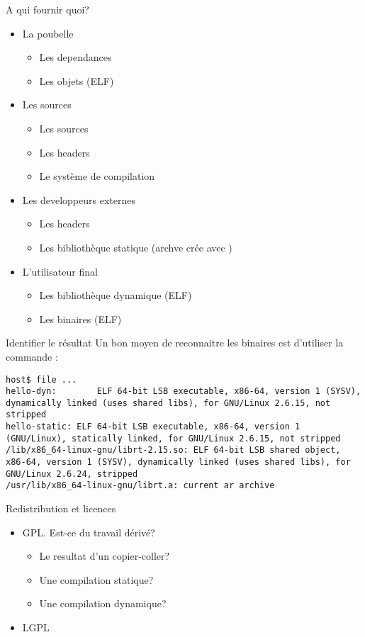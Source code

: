 \begin{frame}[fragile=singleslide]{A qui fournir quoi?}
  \begin{itemize}
  \item La poubelle
    \begin{itemize}
    \item Les dependances
    \item Les objets (ELF)
    \end{itemize}
  \item Les sources
    \begin{itemize}
    \item Les sources
    \item Les headers
    \item Le système de compilation
    \end{itemize}
  \item Les developpeurs externes
    \begin{itemize}
    \item Les headers
    \item Les bibliothèque statique (archve crée avec )
    \end{itemize}
  \item L'utilisateur final
    \begin{itemize}
    \item Les bibliothèque dynamique (ELF)
    \item Les binaires (ELF)
    \end{itemize}
  \end{itemize}
\end{frame}

\begin{frame}[fragile=singleslide]{Identifier le résultat}
  Un bon moyen de reconnaitre  les binaires est d'utiliser la commande
  :
  \begin{lstlisting}
host$ file ...
hello-dyn:        ELF 64-bit LSB executable, x86-64, version 1 (SYSV), dynamically linked (uses shared libs), for GNU/Linux 2.6.15, not stripped
hello-static: ELF 64-bit LSB executable, x86-64, version 1 (GNU/Linux), statically linked, for GNU/Linux 2.6.15, not stripped
/lib/x86_64-linux-gnu/librt-2.15.so: ELF 64-bit LSB shared object, x86-64, version 1 (SYSV), dynamically linked (uses shared libs), for GNU/Linux 2.6.24, stripped
/usr/lib/x86_64-linux-gnu/librt.a: current ar archive
\end{lstlisting} %
\end{frame}

\begin{frame}[fragile=singleslide]{Redistribution et licences}
  \begin{itemize}
  \item GPL. Est-ce du travail dérivé?
    \begin{itemize}
    \item Le resultat d'un copier-coller?
    \item Une compilation statique?
    \item Une compilation dynamique?
    \end{itemize}
  \item LGPL
  \end{itemize}
\end{frame}


